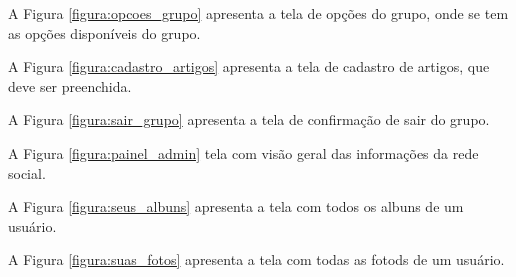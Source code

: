 A Figura \ref{figura:opcoes_grupo} apresenta a tela de opções do grupo, onde se tem as opções disponíveis do grupo.


A Figura \ref{figura:cadastro_artigos} apresenta a tela de cadastro de artigos, que deve ser preenchida.


A Figura \ref{figura:sair_grupo} apresenta a tela de confirmação de sair do grupo.


A Figura \ref{figura:painel_admin} tela com visão geral das informações da rede social.


A Figura \ref{figura:seus_albuns} apresenta a tela com todos os albuns de um usuário.


A Figura \ref{figura:suas_fotos} apresenta a tela com todas as fotods de um usuário.


